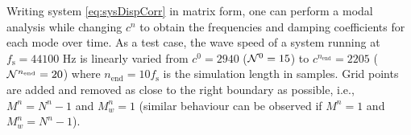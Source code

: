 Writing system \eqref{eq:sysDispCorr} in matrix form, one can perform a modal analysis while changing $c^n$ to obtain the frequencies and damping coefficients for each mode over time. As a test case, the wave speed of a system running at $f_\text{s} = 44100$ Hz is linearly varied from $c^0 = 2940$ ($\mathcal{N}^0 = 15$) to $c^{n_\text{end}} = 2205$ ($\mathcal{N}^{n_\text{end}} = 20$) where $n_\text{end} = 10 f_\text{s}$ is the simulation length in samples. Grid points are added and removed as close to the right boundary as possible, i.e., $M^n = N^n-1$ and $M_w^n = 1$ (similar behaviour can be observed if $M^n = 1$ and $M_w^n = N^n-1$).  %
